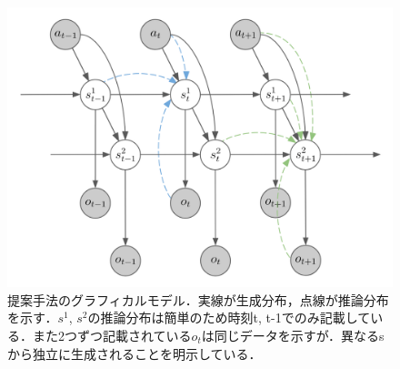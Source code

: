 \documentclass[10pt, twocolumn]{jarticle}
\begin{document}
\begin{figure}[h]
  \begin{center}
    \includegraphics[width=\linewidth]{./figures/proposal_train.png}
    \caption[提案手法(二階層)のグラフィカルモデル]{\small 提案手法のグラフィカルモデル．実線が生成分布，点線が推論分布を示す．$s^1$, $s^2$の推論分布は簡単のため時刻t, t-1でのみ記載している．また2つずつ記載されている$o_t$は同じデータを示すが．異なるsから独立に生成されることを明示している．}
    \label{fig:proposal}
  \end{center}
\end{figure}



\end{document}
